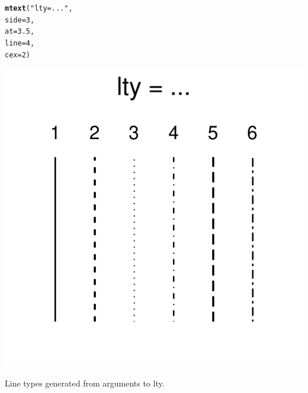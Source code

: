 \documentclass{tufte-book}\usepackage[]{graphicx}\usepackage[]{color}
\makeatletter
\def\maxwidth{ %
  \ifdim\Gin@nat@width>\linewidth
    \linewidth
  \else
    \Gin@nat@width
  \fi
}
\newcommand{\hlnum}[1]{\textcolor[rgb]{0.686,0.059,0.569}{#1}}%
\newcommand{\hlstr}[1]{\textcolor[rgb]{0.192,0.494,0.8}{#1}}%
\newcommand{\hlstd}[1]{\textcolor[rgb]{0.345,0.345,0.345}{#1}}%
\newcommand{\hlkwc}[1]{\textcolor[rgb]{0.333,0.667,0.333}{#1}}%
\newcommand{\hlkwd}[1]{\textcolor[rgb]{0.737,0.353,0.396}{\textbf{#1}}}%
\newenvironment{kframe}{%
 \def\at@end@of@kframe{}%
 \ifinner\ifhmode%
  \def\at@end@of@kframe{\end{minipage}}%
  \begin{minipage}{\columnwidth}%
 \fi\fi%
 \def\FrameCommand##1{\hskip\@totalleftmargin \hskip-\fboxsep
 \colorbox{shadecolor}{##1}\hskip-\fboxsep
     \hskip-\linewidth \hskip-\@totalleftmargin \hskip\columnwidth}%
 \MakeFramed {\advance\hsize-\width
   \@totalleftmargin\z@ \linewidth\hsize
   \@setminipage}}%
 {\par\unskip\endMakeFramed%
 \at@end@of@kframe}
\newenvironment{knitrout}{}{} %
\makeatother
\begin{document}
\begin{marginfigure}
\begin{tiny}
\begin{knitrout}
\begin{kframe}
\begin{alltt}
\hlkwd{mtext}\hlstd{(}\hlstr{"lty = ..."}\hlstd{,}
      \hlkwc{side} \hlstd{=} \hlnum{3}\hlstd{,}
      \hlkwc{at} \hlstd{=} \hlnum{3.5}\hlstd{,}
      \hlkwc{line} \hlstd{=} \hlnum{4}\hlstd{,}
      \hlkwc{cex} \hlstd{=} \hlnum{2}\hlstd{)}
\end{alltt}
\end{kframe}
\includegraphics[width=\maxwidth]{figure/unnamed-chunk-207-1} 

\end{knitrout}
\end{tiny}
\label{fig:ltytypes}
\caption{Line types generated from arguments to lty.}
\end{marginfigure}
\end{document}
